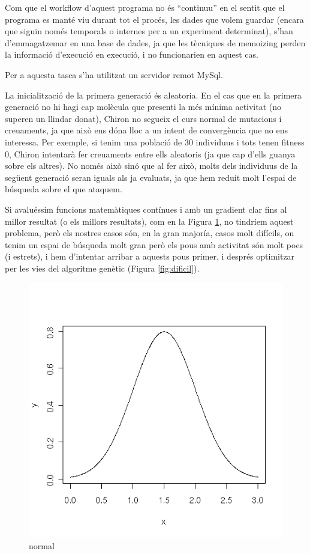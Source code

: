\documentclass[titlepage,a4paper,12pt]{book}
\begin{document}
Com que el workflow d'aquest programa no és ``continuu'' en el sentit que el
programa es manté viu durant tot el procés, les dades que volem guardar (encara
que siguin només temporals o internes per a un experiment determinat), s'han
d'emmagatzemar en una base de dades, ja que les tècniques de memoizing %
perden la informació d'execució en execució, i no funcionarien en aquest cas.

Per a aquesta tasca s'ha utilitzat un servidor remot MySql.

La inicialització de la primera generació és aleatoria. En el cas que en la
primera generació no hi hagi cap molècula que presenti la més mínima activitat
(no superen un llindar donat), Chiron no segueix el curs normal de mutacions i
creuaments, ja que això ens dóna lloc a un intent de convergència que no ens
interessa.  Per exemple, si tenim una població de 30 individuus i tots tenen
fitness 0, Chiron intentarà fer creuaments entre ells aleatoris (ja que cap
d'ells guanya sobre els altres).  No només això sinó que al fer això, molts dels
individuus de la següent generació seran iguals als ja evaluats, ja que hem
reduit molt l'espai de búsqueda sobre el que ataquem.

Si avaluéssim funcions matemàtiques contínues i amb un gradient clar fins al
millor resultat (o els millors resultats), com en la Figura \ref{fig:normal}, no
tindríem aquest problema, però els nostres casos són, en la gran majoría, casos
molt difícils, on tenim un espai de búsqueda molt gran però els pous amb
activitat són molt pocs (i estrets), i hem d'intentar arribar a aquests pous
primer, i després optimitzar per les vies del algoritme genètic (Figura
\ref{fig:dificil}).

\begin{figure}[h]
	\begin{center}
		\includegraphics{chiron/normal.png}
	\end{center}
	\caption{normal}
	\label{fig:normal}
\end{figure}
\end{document}
